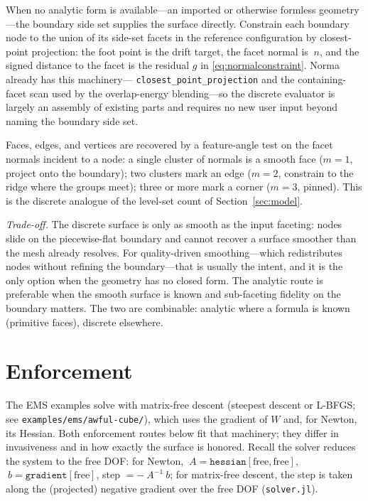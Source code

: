 \documentclass[11pt]{article}
\newcommand{\code}[1]{\texttt{#1}}
\begin{document}
When no analytic form is available---an imported or otherwise formless
geometry---the boundary side set supplies the surface directly. Constrain each
boundary node to the union of its side-set facets in the reference
configuration by closest-point projection: the foot point is the drift target,
the facet normal is $~n$, and the signed distance to the facet is the residual
$g$ in \eqref{eq:normalconstraint}. Norma already has this machinery---
\code{closest\_point\_projection} and the containing-facet scan used by the
overlap-energy blending---so the discrete evaluator is largely an assembly of
existing parts and requires no new user input beyond naming the boundary side
set.

Faces, edges, and vertices are recovered by a feature-angle test on the facet
normals incident to a node: a single cluster of normals is a smooth face
($m=1$, project onto the boundary); two clusters mark an edge ($m=2$, constrain
to the ridge where the groups meet); three or more mark a corner ($m=3$,
pinned). This is the discrete analogue of the level-set count of
Section~\ref{sec:model}.

\emph{Trade-off.} The discrete surface is only as smooth as the input faceting:
nodes slide on the piecewise-flat boundary and cannot recover a surface smoother
than the mesh already resolves. For quality-driven smoothing---which
redistributes nodes without refining the boundary---that is usually the intent,
and it is the only option when the geometry has no closed form. The analytic
route is preferable when the smooth surface is known and sub-faceting fidelity
on the boundary matters. The two are combinable: analytic where a formula is
known (primitive faces), discrete elsewhere.

\section{Enforcement}
\label{sec:enforcement}

The EMS examples solve with matrix-free descent (steepest descent or L-BFGS;
see \code{examples/\allowbreak ems/\allowbreak awful-cube/}), which uses the gradient of $W$ and, for
Newton, its Hessian. Both enforcement routes below fit that machinery; they
differ in invasiveness and in how exactly the surface is honored. Recall the
solver reduces the system to the free DOF: for Newton,
$~A = \code{hessian}[\text{free},\text{free}]$,
$~b = \code{gradient}[\text{free}]$, step $= -~A^{-1}~b$; for matrix-free
descent, the step is taken along the (projected) negative gradient over the
free DOF (\code{solver.jl}).
\end{document}
